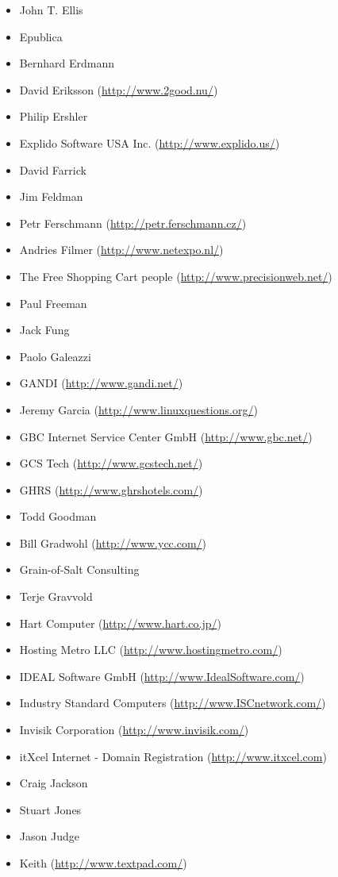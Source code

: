 \documentclass[a4paper,titlepage,12pt]{article}
\begin{document}
\begin{itemize}
	\item John T. Ellis
	\item Epublica
	\item Bernhard Erdmann
	\item David Eriksson (\url{http://www.2good.nu/})
	\item Philip Ershler
	\item Explido Software USA Inc. (\url{http://www.explido.us/})
	\item David Farrick
	\item Jim Feldman
	\item Petr Ferschmann (\url{http://petr.ferschmann.cz/})
	\item Andries Filmer (\url{http://www.netexpo.nl/})
	\item The Free Shopping Cart people (\url{http://www.precisionweb.net/})
	\item Paul Freeman
	\item Jack Fung
	\item Paolo Galeazzi
	\item GANDI (\url{http://www.gandi.net/})
	\item Jeremy Garcia (\url{http://www.linuxquestions.org/})
	\item GBC Internet Service Center GmbH (\url{http://www.gbc.net/})
	\item GCS Tech (\url{http://www.gcstech.net/})
	\item GHRS (\url{http://www.ghrshotels.com/})
	\item Todd Goodman
	\item Bill Gradwohl (\url{http://www.ycc.com/})
	\item Grain-of-Salt Consulting
	\item Terje Gravvold
	\item Hart Computer (\url{http://www.hart.co.jp/})
	\item Hosting Metro LLC (\url{http://www.hostingmetro.com/})
	\item IDEAL Software GmbH (\url{http://www.IdealSoftware.com/})
	\item Industry Standard Computers (\url{http://www.ISCnetwork.com/})
	\item Invisik Corporation (\url{http://www.invisik.com/})
	\item itXcel Internet - Domain Registration (\url{http://www.itxcel.com})
	\item Craig Jackson
	\item Stuart Jones
	\item Jason Judge
	\item Keith (\url{http://www.textpad.com/})

\end{itemize}
\end{document}
